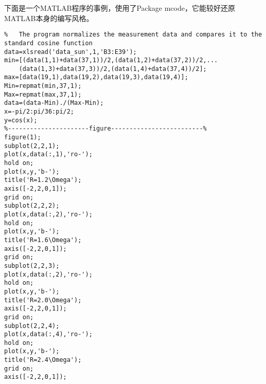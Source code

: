 \begin{appendix}
下面是一个MATLAB程序的事例，使用了Package mcode，它能较好还原MATLAB本身的编写风格。
\begin{lstlisting}
%   The program normalizes the measurement data and compares it to the standard cosine function
data=xlsread('data_sun',1,'B3:E39');
min=[(data(1,1)+data(37,1))/2,(data(1,2)+data(37,2))/2,...
    (data(1,3)+data(37,3))/2,(data(1,4)+data(37,4))/2];
max=[data(19,1),data(19,2),data(19,3),data(19,4)];
Min=repmat(min,37,1);
Max=repmat(max,37,1);
data=(data-Min)./(Max-Min);
x=-pi/2:pi/36:pi/2;
y=cos(x);
%----------------------figure-------------------------%
figure(1);
subplot(2,2,1);
plot(x,data(:,1),'ro-');
hold on;
plot(x,y,'b-');
title('R=1.2\Omega');
axis([-2,2,0,1]);
grid on;
subplot(2,2,2);
plot(x,data(:,2),'ro-');
hold on;
plot(x,y,'b-');
title('R=1.6\Omega');
axis([-2,2,0,1]);
grid on;
subplot(2,2,3);
plot(x,data(:,2),'ro-');
hold on;
plot(x,y,'b-');
title('R=2.0\Omega');
axis([-2,2,0,1]);
grid on;
subplot(2,2,4);
plot(x,data(:,4),'ro-');
hold on;
plot(x,y,'b-');
title('R=2.4\Omega');
grid on;
axis([-2,2,0,1]);
\end{lstlisting}


\end{appendix}
